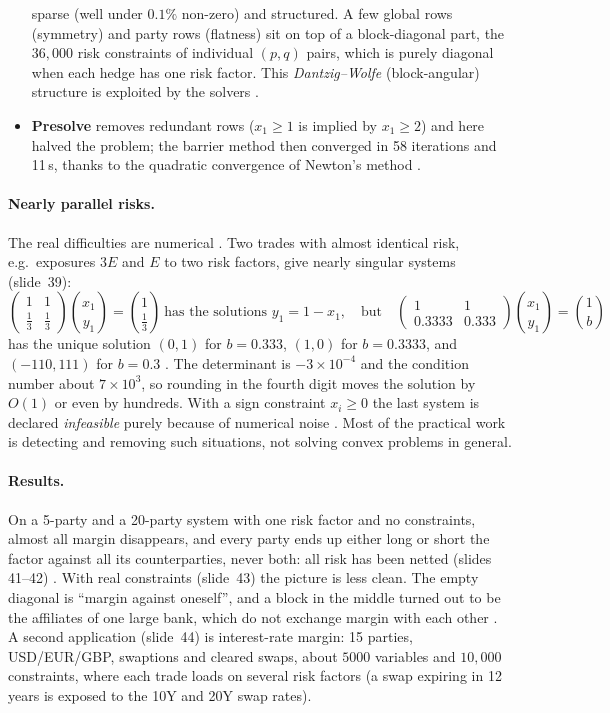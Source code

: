 \begin{paracol}{2}
\begin{itemize}
        sparse (well under $0.1\%$ non-zero) and structured. A few global rows (symmetry) and party rows (flatness)
        sit on top of a block-diagonal part, the $36{,}000$ risk constraints of individual $(p,q)$ pairs, which is
        purely diagonal when each hedge has one risk factor. This \emph{Dantzig--Wolfe} (block-angular) structure
        is exploited by the solvers .
  \item \textbf{Presolve} removes redundant rows ($x_1\ge1$ is implied by $x_1\ge2$) and here halved the problem;
        the barrier method then converged in 58 iterations and 11\,s, thanks to the quadratic convergence of Newton's
        method .
\end{itemize}

\paragraph{Nearly parallel risks.} The real difficulties are numerical . Two trades with almost
identical risk, e.g.\ exposures $3E$ and $E$ to two risk factors, give nearly singular systems (slide~39):
\[
  \begin{pmatrix}1&1\\ \tfrac13&\tfrac13\end{pmatrix}\binom{x_1}{y_1}=\binom{1}{\tfrac13}\ \text{has the solutions } y_1=1-x_1,
  \quad\text{but}\quad
  \begin{pmatrix}1&1\\ 0.3333&0.333\end{pmatrix}\binom{x_1}{y_1}=\binom{1}{b}
\]
has the unique solution $(0,1)$ for $b=0.333$, $(1,0)$ for $b=0.3333$, and $(-110,111)$ for $b=0.3$
. The determinant is $-3\times10^{-4}$ and the condition number about $7\times10^3$, so rounding in
the fourth digit moves the solution by $O(1)$ or even by hundreds. With a sign constraint $x_i\ge0$ the last system
is declared \emph{infeasible} purely because of numerical noise . Most of the practical work is
detecting and removing such situations, not solving convex problems in general.

\paragraph{Results.} On a 5-party and a 20-party system with one risk factor and no constraints, almost all margin
disappears, and every party ends up either long or short the factor against all its counterparties, never both:
all risk has been netted (slides 41--42) . With real constraints (slide~43) the picture is less
clean. The empty diagonal is ``margin against oneself'', and a block in the middle turned out to be the affiliates
of one large bank, which do not exchange margin with each other . A second application
(slide~44) is interest-rate margin: 15 parties, USD/EUR/GBP, swaptions and cleared swaps, about $5000$ variables
and $10{,}000$ constraints, where each trade loads on several risk factors (a swap expiring in 12 years is exposed to
the 10Y and 20Y swap rates).


\end{paracol}
